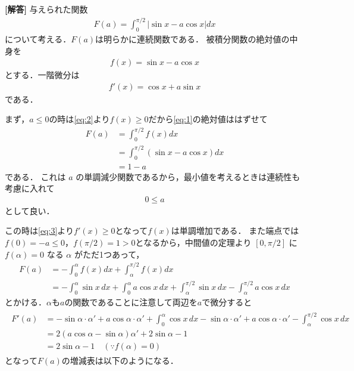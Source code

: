 \documentclass[../../main.tex]{subfiles}
\begin{document}
\begin{oframed}
  
\end{oframed}

{\bf [解答]}
与えられた関数
\begin{align}
  F(a)= \int_0^{\pi/2}|\sin x-a\cos x|dx \label{eq:1}
\end{align}
について考える．$F(a)$は明らかに連続関数である．
被積分関数の絶対値の中身を
\begin{align}
  f(x)=\sin x - a \cos x \label{eq:2}
\end{align}
とする．一階微分は
\begin{align}
  f'(x) = \cos x + a\sin x \label{eq:3}
\end{align}
である．

まず，$a \le 0$の時は\cref{eq:2}より$f(x) \ge 0$だから\cref{eq:1}の絶対値ははずせて
\begin{align}
  F(a)
  &=\int_0^{\pi/2}f(x) dx \\
  &=\int_0^{\pi/2}(\sin x - a \cos x) dx \\
  &=1-a
\end{align}
である．
これは $a$ の単調減少関数であるから，最小値を考えるときは連続性も考慮に入れて
\begin{align}
  0\le a \label{eq:4}
\end{align}
として良い．

この時は\cref{eq:3}より$f'(x) \ge 0$となって$f(x)$は単調増加である．
また端点では$f(0)=-a\le0$，$f(\pi/2)=1>0$となるから，中間値の定理より
$[0,\pi/2]$ に $f(\alpha)=0$ なる $\alpha$ がただ1つあって，
\begin{align}
  F(a)
  &=-\int_0^\alpha f(x)dx+\int_\alpha^{\pi/2}f(x)dx \\
  &= -\int_0^\alpha \sin x\,dx+\int_0^\alpha a\cos x\,dx+\int_\alpha^{\pi/2}\sin x\,dx-\int_\alpha^{\pi/2}a\cos x\,dx \label{eq:5}
\end{align}
とかける．$\alpha$も$a$の関数であることに注意して両辺を$a$で微分すると
\begin{align}
  \begin{split}
    F'(a)
    &= -\sin\alpha\cdot\alpha'+a\cos\alpha\cdot\alpha'+\int_0^\alpha \cos x\,dx-\sin\alpha\cdot\alpha'+a\cos\alpha\cdot\alpha'-\int_\alpha^{\pi/2}\cos x\,dx \\
    &=2(a\cos\alpha-\sin\alpha)\alpha'+2\sin\alpha-1 \\
    &= 2\sin\alpha-1 \quad (\because f(\alpha)=0)
  \end{split}
\end{align}
となって$F(a)$の増減表は以下のようになる．
\end{document}
